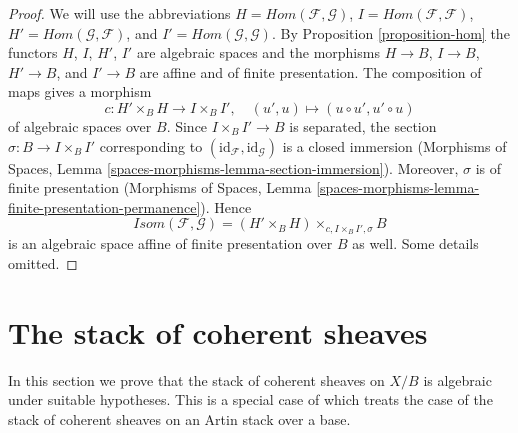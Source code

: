 \begin{proof}
We will use the abbreviations
$H = \mathit{Hom}(\mathcal{F}, \mathcal{G})$,
$I = \mathit{Hom}(\mathcal{F}, \mathcal{F})$,
$H' = \mathit{Hom}(\mathcal{G}, \mathcal{F})$, and
$I' = \mathit{Hom}(\mathcal{G}, \mathcal{G})$.
By Proposition \ref{proposition-hom} the functors
$H$, $I$, $H'$, $I'$ are algebraic spaces and the morphisms
$H \to B$, $I \to B$, $H' \to B$, and $I' \to B$
are affine and of finite presentation.
The composition of maps gives a morphism
$$
c : H' \times_B H \longrightarrow I \times_B I',\quad
(u', u) \longmapsto (u \circ u', u' \circ u)
$$
of algebraic spaces over $B$. Since $I \times_B I' \to B$ is separated,
the section $\sigma : B \to I \times_B I'$ corresponding to
$(\text{id}_\mathcal{F}, \text{id}_\mathcal{G})$
is a closed immersion
(Morphisms of Spaces, Lemma \ref{spaces-morphisms-lemma-section-immersion}).
Moreover, $\sigma$ is of finite presentation
(Morphisms of Spaces, Lemma
\ref{spaces-morphisms-lemma-finite-presentation-permanence}).
Hence
$$
\mathit{Isom}(\mathcal{F}, \mathcal{G}) =
(H' \times_B H) \times_{c, I \times_B I', \sigma} B
$$
is an algebraic space affine of finite presentation over $B$ as well.
Some details omitted.
\end{proof}






\section{The stack of coherent sheaves}
\label{section-stack-coherent-sheaves}

\noindent
In this section we prove that the stack of coherent sheaves 
on $X/B$ is algebraic under suitable hypotheses. This is a
special case of \cite[Theorem 2.1.1]{lieblich_remarks}
which treats the case of the stack of coherent sheaves on an
Artin stack over a base.


